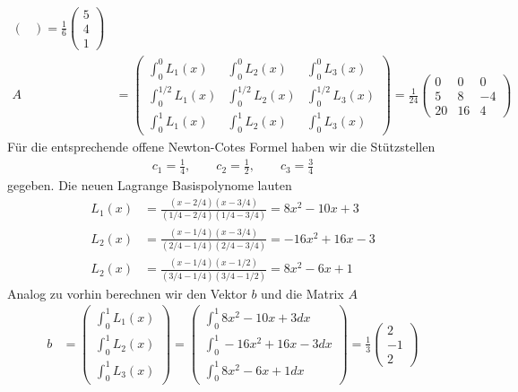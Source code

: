 \begin{solution}
\begin{align*}
\begin{pmatrix}
  \end{pmatrix}
  = \frac{1}{6}\begin{pmatrix}
    5 \\ 4 \\ 1
  \end{pmatrix} \\
  A &= \begin{pmatrix}
    \int_0^0 L_1(x) & \int_0^0 L_2(x) & \int_0^0 L_3(x)\\
    \int_0^{1/2} L_1(x) & \int_0^{1/2} L_2(x) & \int_0^{1/2} L_3(x)\\
    \int_0^1 L_1(x) & \int_0^1 L_2(x) & \int_0^1 L_3(x)
  \end{pmatrix}
  = \frac{1}{24}\begin{pmatrix}
    0 & 0 & 0\\
    5 & 8 & -4\\
    20 & 16 & 4
  \end{pmatrix}
\end{align*}
Für die entsprechende offene Newton-Cotes Formel haben wir die Stützstellen
\begin{align*}
  c_1 = \frac{1}{4}, \qquad c_2 = \frac{1}{2}, \qquad c_3 = \frac{3}{4}
\end{align*}
gegeben. Die neuen Lagrange Basispolynome lauten
\begin{align*}
  L_1(x) &= \frac{(x - 2/4)(x - 3/4)}{(1/4-2/4)(1/4-3/4)} = 8x^2 - 10x + 3 \\
  L_2(x) &= \frac{(x - 1/4)(x - 3/4)}{(2/4-1/4)(2/4-3/4)} = -16x^2 + 16x - 3 \\
  L_2(x) &= \frac{(x - 1/4)(x - 1/2)}{(3/4-1/4)(3/4-1/2)} = 8x^2 - 6x + 1
\end{align*}
Analog zu vorhin berechnen wir den Vektor $b$ und die Matrix $A$
\begin{align*}
b &= \begin{pmatrix}
  \int_0^1 L_1(x) \\ \int_0^1 L_2(x) \\ \int_0^1 L_3(x)
\end{pmatrix}
= \begin{pmatrix}
  \int_0^1 8x^2 - 10x + 3 dx \\
  \int_0^1 -16x^2 + 16x - 3 dx \\
  \int_0^1 8x^2 - 6x + 1 dx
\end{pmatrix}
= \frac{1}{3}\begin{pmatrix}
  2 \\ -1 \\ 2
\end{pmatrix} \\

\end{align*}
\end{solution}
